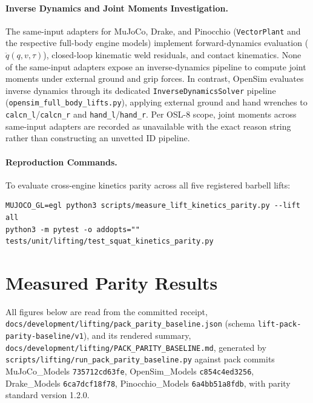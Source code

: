 \documentclass[11pt,a4paper]{article}
\begin{document}
\paragraph{Inverse Dynamics and Joint Moments Investigation.}
The same-input adapters for MuJoCo, Drake, and Pinocchio (\texttt{VectorPlant} and the respective full-body engine models) implement forward-dynamics evaluation ($\ddot{q}(q, v, \tau)$), closed-loop kinematic weld residuals, and contact kinematics. None of the same-input adapters expose an inverse-dynamics pipeline to compute joint moments under external ground and grip forces. In contrast, OpenSim evaluates inverse dynamics through its dedicated \texttt{InverseDynamicsSolver} pipeline (\texttt{opensim\_full\_body\_lifts.py}), applying external ground and hand wrenches to \texttt{calcn\_l}/\texttt{calcn\_r} and \texttt{hand\_l}/\texttt{hand\_r}.
Per OSL-8 scope, joint moments across same-input adapters are recorded as unavailable with the exact reason string rather than constructing an unvetted ID pipeline.

\paragraph{Reproduction Commands.}
To evaluate cross-engine kinetics parity across all five registered barbell lifts:
\begin{verbatim}
MUJOCO_GL=egl python3 scripts/measure_lift_kinetics_parity.py --lift all
python3 -m pytest -o addopts="" tests/unit/lifting/test_squat_kinetics_parity.py
\end{verbatim}

\section{Measured Parity Results}
All figures below are read from the committed receipt,
\texttt{docs/development/lifting/pack\_parity\_baseline.json} (schema
\texttt{lift-pack-parity-baseline/v1}), and its rendered summary,
\texttt{docs/development/lifting/PACK\_PARITY\_BASELINE.md}, generated by
\texttt{scripts/lifting/run\_pack\_parity\_baseline.py} against pack commits
MuJoCo\_Models \texttt{735712cd63fe}, OpenSim\_Models \texttt{c854c4ed3256},
Drake\_Models \texttt{6ca7dcf18f78}, Pinocchio\_Models \texttt{6a4bb51a8fdb},
with parity standard version 1.2.0.
\end{document}
